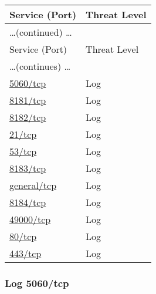 \documentclass{article}
\begin{document}
\begin{longtable}{|l|l|}
\hline
\rowcolor{gvm_report}Service (Port)&Threat Level\\
\hline
\endfirsthead
\multicolumn{2}{l}{\hfill\ldots (continued) \ldots}\\
\hline
\rowcolor{gvm_report}Service (Port)&Threat Level\\
\hline
\endhead
\hline
\multicolumn{2}{l}{\ldots (continues) \ldots}\\
\endfoot
\hline
\endlastfoot
\hline
\hyperref[port:192.168.178.1 5060/tcp Log]{5060/tcp}&Log\\
\hline
\hyperref[port:192.168.178.1 8181/tcp Log]{8181/tcp}&Log\\
\hline
\hyperref[port:192.168.178.1 8182/tcp Log]{8182/tcp}&Log\\
\hline
\hyperref[port:192.168.178.1 21/tcp Log]{21/tcp}&Log\\
\hline
\hyperref[port:192.168.178.1 53/tcp Log]{53/tcp}&Log\\
\hline
\hyperref[port:192.168.178.1 8183/tcp Log]{8183/tcp}&Log\\
\hline
\hyperref[port:192.168.178.1 general/tcp Log]{general/tcp}&Log\\
\hline
\hyperref[port:192.168.178.1 8184/tcp Log]{8184/tcp}&Log\\
\hline
\hyperref[port:192.168.178.1 49000/tcp Log]{49000/tcp}&Log\\
\hline
\hyperref[port:192.168.178.1 80/tcp Log]{80/tcp}&Log\\
\hline
\hyperref[port:192.168.178.1 443/tcp Log]{443/tcp}&Log\\
\hline
\end{longtable}



\subsubsection{Log 5060/tcp}
\label{port:192.168.178.1 5060/tcp Log}
\end{document}
